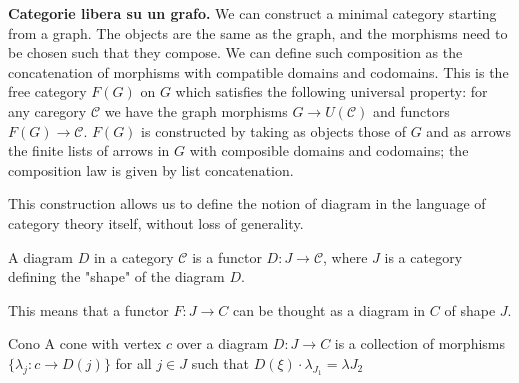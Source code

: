 \documentclass[a4paper]{article}
\begin{document}
\textbf{Categorie libera su un grafo.}
We can construct a minimal category starting from a graph.
The objects are the same as the graph, and the morphisms
need to be chosen such that they compose.
We can define such composition as the concatenation of morphisms
with compatible domains and codomains.
This is the free category \(F(G)\) on \(G\) which satisfies the following universal property:
for any caregory \(\mathcal{C}\)
we have the graph morphisms \(G \to U(\mathcal{C})\)
and functors \(F(G) \to \mathcal{C}\).
\(F(G)\) is constructed by taking as objects those of \(G\)
and as arrows the finite lists of arrows in \(G\)
with composible domains and codomains; the composition law is given by list concatenation.

This construction allows us to define the notion of diagram
in the language of category theory itself, without loss of generality.

\begin{snippetdefinition}{}
    A diagram \(D\) in a category \(\mathcal{C}\)
    is a functor \(D \colon J \to \mathcal{C}\), where \(J\)
    is a category defining the "shape" of the diagram \(D\).
\end{snippetdefinition}

This means that a functor \(F \colon J \to C\) can be thought as a diagram in \(C\)
of shape \(J\).

\begin{snippetdefinition}{Cono}
    A cone with vertex \(c\) over a diagram \(D \colon J \to C\)
    is a collection of morphisms \(\{\lambda_j \colon c \to D(j)\}\) for all \(j \in J\)
    such that \(D(\xi) \cdot \lambda_{J_1} = \lambda{J_2}\)
\end{snippetdefinition}
\begin{center}
\end{center}
\end{document}
